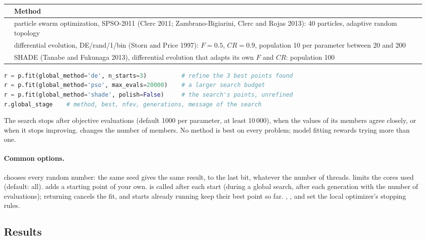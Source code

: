 \begin{center}
\begin{tabularx}{\textwidth}{lY}
\toprule
{} & Method \\
\midrule
{} & particle swarm optimization, SPSO-2011 (Clerc 2011; Zambrano-Bigiarini, Clerc and Rojas 2013):
  40 particles, adaptive random topology \\
 & differential evolution, DE/rand/1/bin (Storn and Price 1997): $F = 0.5$, $CR = 0.9$, population
  10 per parameter between 20 and 200 \\
 & SHADE (Tanabe and Fukunaga 2013), differential evolution that adapts its own $F$ and $CR$:
  population 100 \\
\bottomrule
\end{tabularx}
\end{center}

\begin{lstlisting}[language=Python]
r = p.fit(global_method='de', n_starts=3)          # refine the 3 best points found
r = p.fit(global_method='pso', max_evals=20000)    # a larger search budget
r = p.fit(global_method='shade', polish=False)     # the search's points, unrefined
r.global_stage    # method, best, nfev, generations, message of the search
\end{lstlisting}

The search stops after  objective evaluations (default 1000 per parameter, at least 10\,000),
when the values of its members agree closely, or when it stops improving.  changes the number
of members. No method is best on every problem; model fitting rewards trying more than one.

\paragraph{Common options.}  chooses every random number: the same seed gives the same result, to the
last bit, whatever the number of threads.  limits the cores used (default: all).  adds a
starting point of your own.  is called after each start (during a global
search, after each generation with the number of evaluations); returning  cancels the fit, and starts
already running keep their best point so far. , ,  and  set the
local optimizer's stopping rules.

\subsection{Results}

